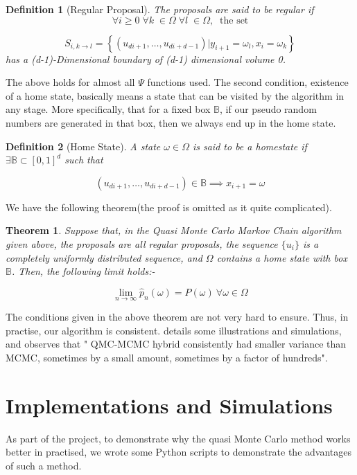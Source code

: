 \documentclass[12pt,letterpaper, twoside]{article}
\newtheorem{theorem}{Theorem}
\newtheorem{definition}{Definition}
\theoremstyle{definition}
\begin{document}
\begin{definition}[Regular Proposal]
The proposals are said to be regular if 
$$
\forall i \geq 0 \; \forall k \;\in \Omega \; \forall l \; \in \Omega, \;\;\text{the set}
$$

$$
S_{i,k \to l} = \left\{ (u_{di+1},\ldots,u_{di+d-1})|y_{i+1} = \omega_l,x_i = \omega_k  \right\}
$$
has a (d-1)-Dimensional boundary of (d-1) dimensional volume 0.
\end{definition}

The above holds for almost all $\Psi$ functions used. The second condition, existence of a home state, basically means a state that can be visited by the algorithm in any stage. More specifically, that for a fixed box $\mathbb{B}$, if our pseudo random numbers are generated in that box, then we always end up in the home state.

\begin{definition}[Home State]
A state $\omega\in \Omega$ is said to be a homestate if $\exists \mathbb{B} \subset [0,1]^d$ such that

$$
(u_{di+1},\ldots,u_{di+d-1}) \in \mathbb{B} \implies x_{i+1} = \omega
$$
\end{definition}

We have the following theorem(the proof is omitted as it quite complicated).

\begin{theorem}
Suppose that, in the Quasi Monte Carlo Markov Chain algorithm given above, the proposals are all regular proposals, the sequence $\{u_i\}$ is a completely uniformly distributed sequence, and $\Omega$ contains a home state with box $\mathbb{B}$. Then, the following limit holds:-

$$
\lim_{n \to \infty} \hat{p}_n(\omega) = P(\omega) \ \forall \omega \in \Omega 
$$ 

\end{theorem}

The conditions given in the above theorem are not very hard to ensure. Thus, in practise, our algorithm is consistent. \cite{owenReport} details some illustrations and simulations, and observes that " QMC-MCMC hybrid consistently had smaller variance than MCMC, sometimes by a small amount, sometimes by a factor of hundreds".

\section{Implementations and Simulations}
As part of the project, to demonstrate why the quasi Monte Carlo method works better in practised, we wrote some Python scripts to demonstrate the advantages of such a method.
\end{document}
